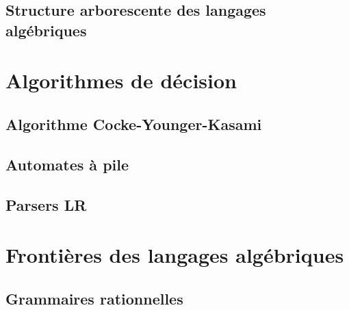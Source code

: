 \subsection{Structure arborescente des langages algébriques}







\section{Algorithmes de décision}
 
\subsection{Algorithme Cocke-Younger-Kasami}





\subsection{Automates à pile}











 
\subsection{Parsers LR}

 
\section{Frontières des langages algébriques}
 
\subsection{Grammaires rationnelles}







 

